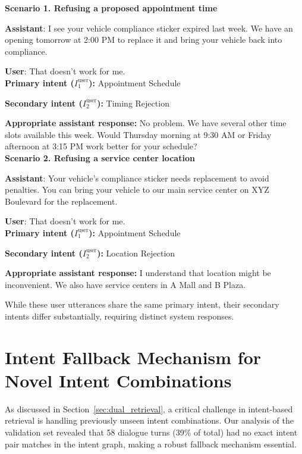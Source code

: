 \documentclass[
]{style/ceurart}
\begin{document}
\begin{tcolorbox}[colback=gray!5, colframe=gray!50]
\fontsize{8pt}{11pt}\selectfont %
\textbf{Scenario 1. Refusing a proposed appointment time}

\textbf{Assistant}: I see your vehicle compliance sticker expired last week. We have an opening tomorrow at 2:00 PM to replace it and bring your vehicle back into compliance.

\textbf{User}: That doesn't work for me.\\

\textbf{Primary intent ($I^{\text{user}}_1$):} Appointment Schedule

\textbf{Secondary intent ($I^{\text{user}}_2$):} Timing Rejection

\textbf{Appropriate assistant response:} No problem. We have several other time slots available this week. Would Thursday morning at 9:30 AM or Friday afternoon at 3:15 PM work better for your schedule?\\

\vspace{1em}
\textbf{Scenario 2. Refusing a service center location}

\textbf{Assistant}: Your vehicle's compliance sticker needs replacement to avoid penalties. You can bring your vehicle to our main service center on XYZ Boulevard for the replacement.

\textbf{User}: That doesn't work for me.\\

\textbf{Primary intent ($I^{\text{user}}_1$):} Appointment Schedule

\textbf{Secondary intent ($I^{\text{user}}_2$):} Location Rejection

\textbf{Appropriate assistant response:} I understand that location might be inconvenient. We also have service centers in A Mall and B Plaza.
\end{tcolorbox}

While these user utterances share the same primary intent, their secondary intents differ substantially, requiring distinct system responses.

\section{Intent Fallback Mechanism for Novel Intent Combinations}
\label{app:fallback}
As discussed in Section~\ref{sec:dual_retrieval}, a critical challenge in intent-based retrieval is handling previously unseen intent combinations. Our analysis of the validation set revealed that 58 dialogue turns (39\% of total) had no exact intent pair matches in the intent graph, making a robust fallback mechanism essential.
\end{document}
